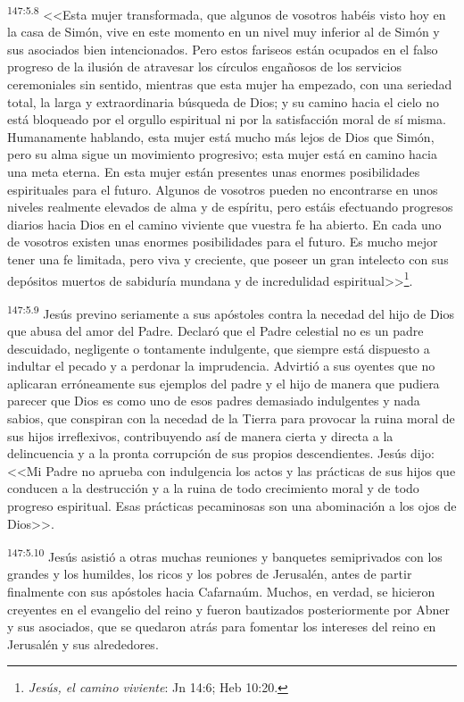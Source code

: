 \par 
\textsuperscript{147:5.8} <<Esta mujer transformada, que algunos de vosotros habéis visto hoy en la casa de Simón, vive en este momento en un nivel muy inferior al de Simón y sus asociados bien intencionados. Pero estos fariseos están ocupados en el falso progreso de la ilusión de atravesar los círculos engañosos de los servicios ceremoniales sin sentido, mientras que esta mujer ha empezado, con una seriedad total, la larga y extraordinaria búsqueda de Dios; y su camino hacia el cielo no está bloqueado por el orgullo espiritual ni por la satisfacción moral de sí misma. Humanamente hablando, esta mujer está mucho más lejos de Dios que Simón, pero su alma sigue un movimiento progresivo; esta mujer está en camino hacia una meta eterna. En esta mujer están presentes unas enormes posibilidades espirituales para el futuro. Algunos de vosotros pueden no encontrarse en unos niveles realmente elevados de alma y de espíritu, pero estáis efectuando progresos diarios hacia Dios en el camino viviente que vuestra fe ha abierto. En cada uno de vosotros existen unas enormes posibilidades para el futuro. Es mucho mejor tener una fe limitada, pero viva y creciente, que poseer un gran intelecto con sus depósitos muertos de sabiduría mundana y de incredulidad espiritual>>\footnote{\textit{Jesús, el camino viviente}: Jn 14:6; Heb 10:20.}.

\par 
\textsuperscript{147:5.9} Jesús previno seriamente a sus apóstoles contra la necedad del hijo de Dios que abusa del amor del Padre. Declaró que el Padre celestial no es un padre descuidado, negligente o tontamente indulgente, que siempre está dispuesto a indultar el pecado y a perdonar la imprudencia. Advirtió a sus oyentes que no aplicaran erróneamente sus ejemplos del padre y el hijo de manera que pudiera parecer que Dios es como uno de esos padres demasiado indulgentes y nada sabios, que conspiran con la necedad de la Tierra para provocar la ruina moral de sus hijos irreflexivos, contribuyendo así de manera cierta y directa a la delincuencia y a la pronta corrupción de sus propios descendientes. Jesús dijo: <<Mi Padre no aprueba con indulgencia los actos y las prácticas de sus hijos que conducen a la destrucción y a la ruina de todo crecimiento moral y de todo progreso espiritual. Esas prácticas pecaminosas son una abominación a los ojos de Dios>>.

\par 
\textsuperscript{147:5.10} Jesús asistió a otras muchas reuniones y banquetes semiprivados con los grandes y los humildes, los ricos y los pobres de Jerusalén, antes de partir finalmente con sus apóstoles hacia Cafarnaúm. Muchos, en verdad, se hicieron creyentes en el evangelio del reino y fueron bautizados posteriormente por Abner y sus asociados, que se quedaron atrás para fomentar los intereses del reino en Jerusalén y sus alrededores.

